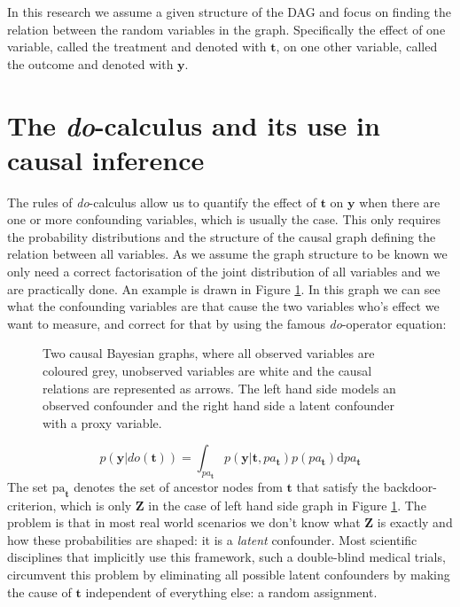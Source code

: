 \documentclass{report}
\newcommand{\bt}{\mathbf{t}}
\newcommand{\by}{\mathbf{y}}
\newcommand{\bZ}{\mathbf{Z}}
\begin{document}
In this research we assume a given structure of the DAG and focus on finding the relation between the random variables in the graph. Specifically the effect of one variable, called the treatment and denoted with $\bt$, on one other variable, called the outcome and denoted with $\by$. 

\section{The \textit{do}-calculus and its use in causal inference}
The rules of \textit{do}-calculus allow us to quantify the effect of $\bt$ on $\by$ when there are one or more confounding variables, which is usually the case. This only requires the probability distributions and the structure of the causal graph defining the relation between all variables. As we assume the graph structure to be known we only need a correct factorisation of the joint distribution of all variables and we are practically done. An example is drawn in Figure \ref{fig:graph_observed_confounder_and_latent_with_proxy}. In this graph we can see what the confounding variables are that cause the two variables who's effect we want to measure, and correct for that by using the famous \textit{do}-operator equation:

\begin{figure}
    \centering
    
    \hspace{2cm}
    
    \caption{Two causal Bayesian graphs, where all observed variables are coloured grey, unobserved variables are white and the causal relations are represented as arrows. The left hand side models an observed confounder and the right hand side a latent confounder with a proxy variable.}
    \label{fig:graph_observed_confounder_and_latent_with_proxy}
\end{figure}


\begin{equation}\label{equation:do_operation}
   p(\by | do(\bt)) = \int_{pa_\bt} p(\by | \bt, pa_{\bt}) p(pa_{\bt}) \text{d} pa_\bt
\end{equation}
The set $\text{pa}_\bt$ denotes the set of ancestor nodes from $\bt$ that satisfy the backdoor-criterion\footnotemark[\ref{note:citation}], which is only $\bZ$ in the case of left hand side graph in Figure \ref{fig:graph_observed_confounder_and_latent_with_proxy}. The problem is that in most real world scenarios we don't know what $\bZ$ is exactly and how these probabilities are shaped: it is a \textit{latent} confounder\footnotemark[\ref{note:citation}]. Most scientific disciplines that implicitly use this framework, such a double-blind medical trials, circumvent this problem by eliminating all possible latent confounders by making the cause of $\bt$ independent of everything else: a random assignment.
\end{document}
